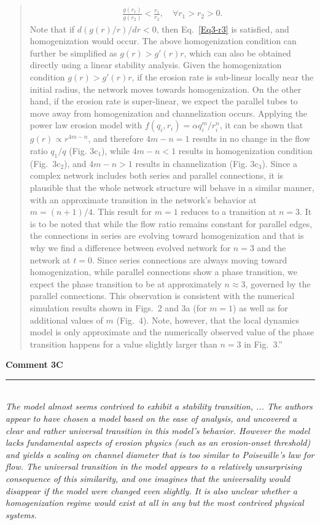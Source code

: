 \documentclass{article}
\newcommand{\Hline}{\rule{\linewidth}{.1mm}}
\newcommand{\Question}[1]{\noindent \color{black}\emph{#1}\normalcolor}
\begin{document}
{\begin{quote}
\begin{align}
        \frac{g(r_1)}{g(r_2)}<\frac{r_1}{r_2}, \quad \forall r_1>r_2>0.   \label{Eq3-r3}
    \end{align}
    Note that if $d\left(g(r)/r\right)/dr<0$, then Eq.~\eqref{Eq3-r3} is satisfied, and homogenization would occur.
    The above homogenization condition can further be simplified as $g(r)>g'(r)r$, which can also be obtained directly using a linear stability analysis. Given the homogenization condition $g(r)>g'(r)r$, if the erosion rate is sub-linear locally near the initial radius, the network moves towards homogenization. On the other hand, if the erosion rate is super-linear, we expect the parallel tubes to move away from homogenization and channelization occurs. Applying the power law erosion model with $f(q_{i},r_i)=\alpha q_i^m/r_i^n$, it can be shown that $g(r) \propto  r^{4m-n} $, and therefore $4m-n=1$ results in no change in the flow ratio $q_1/q$ (Fig. 3c$_1$), while $4m-n<1$ results in homogenization condition (Fig.~3c$_2$), and $4m-n>1$ results in channelization (Fig. 3c$_3$). Since a complex network includes both series and parallel connections, it is plausible that the whole network structure will behave in a similar manner, with an approximate transition in the network's behavior at $ m = (n+1)/4$. This result for $m=1$ reduces to a transition at $n=3$. It is to be noted that while the flow ratio remains constant for parallel edges, the connections in series are evolving toward homogenization and that is why we find a difference between evolved network for $n=3$ and the network at $t=0$. Since series connections are always moving toward homogenization, while parallel connections show a phase transition, we expect the phase transition to be at approximately $n\approx 3$, governed by the parallel connections. This observation  is consistent with the numerical simulation results shown in Figs.~2 and 3a (for $m=1$) as well as for additional values of $m$ (Fig.~4). Note, however, that the local dynamics model is only approximate and the numerically observed value of the phase transition happens for a value slightly larger than $n=3$ in Fig.~3.''
    \end{quote}
}



\vspace{0.5cm}
\textbf{Comment 3C}
\noindent \vspace{-0.2cm}\\ \Hline\\
\Question{The model almost seems contrived to exhibit a stability transition, ... The authors appear to have chosen a model based on the ease of analysis, and uncovered a clear and rather universal transition in this model's behavior. However the model lacks fundamental aspects of erosion physics (such as an erosion-onset threshold) and yields a scaling on channel diameter that is too similar to Poiseuille's law for flow. The universal transition in the model appears to a relatively unsurprising consequence of this similarity, and one imagines that the universality would disappear if the model were changed even slightly. It is also unclear whether a homogenization regime would exist at all in any but the most contrived physical
systems.\newline}
\end{document}
